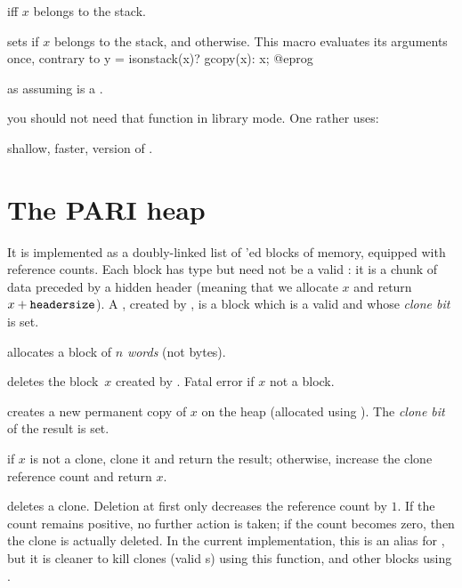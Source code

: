   iff $x$ belongs to the stack.

 sets  if
$x$ belongs to the stack, and  otherwise. This macro evaluates
its arguments once, contrary to
\bprog
  y = isonstack(x)? gcopy(x): x;
@eprog

 as  assuming 
is a .


 you should not need that function in library mode.
One rather uses:

 shallow, faster, version of .

\section{The PARI heap}

It is implemented as a doubly-linked list of 'ed blocks of
memory, equipped with reference counts. Each block has type  but need
not be a valid : it is a chunk of data preceded by a hidden header
(meaning that we allocate $x$ and return $x + {\tt header size}$). A
, created by , is a block which is a valid 
and whose \emph{clone bit} is set.


 allocates a block of $n$ \emph{words} (not bytes).

 deletes the block~$x$ created by .
Fatal error if $x$ not a block.

 creates a new permanent copy of $x$ on the heap
(allocated using ). The \emph{clone bit} of the result is set.

 if $x$ is not a clone, clone it and return the
result; otherwise, increase the clone reference count and return $x$.

 deletes a clone. Deletion at first only decreases
the reference count by $1$. If the count remains positive, no further action is
taken; if the count becomes zero, then the clone is actually deleted. In the
current implementation, this is an alias for , but it is cleaner
to kill clones (valid s) using this function, and other blocks using
.

